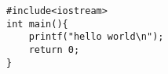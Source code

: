 \documentclass{article}
\begin{document}
\begin{lstlisting}
#include<iostream>
int main(){
    printf("hello world\n");
    return 0;
}
\end{lstlisting}
\end{document}
